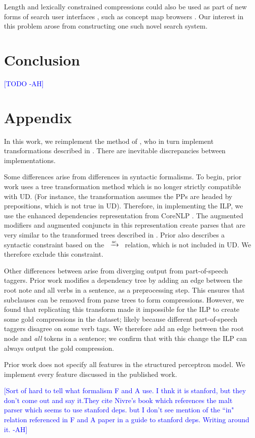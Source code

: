 \documentclass[11pt,a4paper]{article}
\newcommand{\rdep}[1]{\ $\xrightarrow{\text{\tiny #1}}$\ }
\newcommand{\ahcomment}[1]{\textcolor{blue}{[#1 -AH]}}
\begin{document}
Length and lexically constrained compressions could also be used as part of new forms of search user interfaces \cite{hearst2009search}, such as concept map browsers \cite{falke2017graphdocexplore}. Our interest in this problem arose from constructing one such novel search system.

\section{Conclusion}
\ahcomment{TODO}

\section{Appendix}

In this work, we reimplement the method of \citet{filippova2013overcoming}, who in turn implement transformations described in \citet{filippova2008dependency}. There are inevitable discrepancies between implementations. 

Some differences arise from differences in syntactic formalisms. To begin, prior work uses a tree transformation method which is no longer strictly compatible with UD. (For instance, the transformation assumes the PPs are headed by prepositions, which is not true in UD). Therefore, in implementing the ILP, we use the enhanced dependencies representation from CoreNLP \cite{Schuster2016EnhancedEU}. The augmented modifiers and augmented conjuncts in this representation create parses that are very similar to the transformed trees described in \citet{filippova2008dependency}. Prior also describes a syntactic constraint based on the \rdep{sc} relation, which is not included in UD. We therefore exclude this constraint.

Other differences between arise from diverging output from part-of-speech taggers. Prior work modifies a dependency tree by adding an edge between the root note and all verbs in a sentence, as a preprocessing step. This ensures that subclauses can be removed from parse trees to form compressions. However, we found that replicating this transform made it impossible for the ILP to create some gold compressions in the \citet{filippova2013overcoming} dataset; likely because different part-of-speech taggers disagree on some verb tags. We therefore add an edge between the root node and \textit{all} tokens in a sentence; we confirm that with this change the ILP can always output the gold compression.

Prior work does not specify all features in the structured perceptron model. We implement every feature discussed in the published work.

\ahcomment{Sort of hard to tell what formalism F and A use. I thnk it is stanford, but they don't come out and say it.They cite Nivre's book which references the malt parser which seems to use stanford deps. but I don't see mention of the ``in" relation referenced in F and A paper in a guide to stanford deps. Writing around it.}



\end{document}
